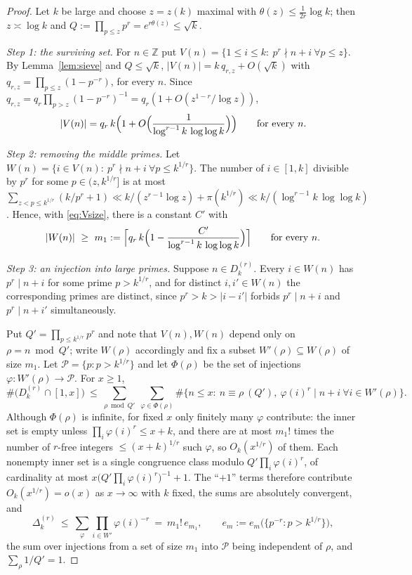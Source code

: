 \documentclass[10pt,a4paper]{amsart}
\numberwithin{equation}{section}
\newcommand{\Z}{\mathbb{Z}}
\begin{document}
\begin{proof}
Let $k$ be large and choose $z=z(k)$ maximal with $\theta(z)\le\frac1{2r}\log k$; then
$z\asymp\log k$ and $Q:=\prod_{p\le z}p^{r}=e^{r\theta(z)}\le\sqrt k$.

\smallskip
\emph{Step 1: the surviving set.}
For $n\in\Z$ put $V(n)=\{1\le i\le k:\ p^{r}\nmid n+i\ \forall p\le z\}$. By
Lemma~\ref{lem:sieve} and $Q\le\sqrt k$,
$|V(n)|=k\,q_{r,z}+O(\sqrt k)$ with $q_{r,z}=\prod_{p\le z}(1-p^{-r})$, for every $n$.
Since $q_{r,z}=q_r\prod_{p>z}(1-p^{-r})^{-1}=q_r(1+O(z^{1-r}/\log z))$,
\begin{equation}\label{eq:Vsize}
  |V(n)|=q_r\,k\Bigl(1+O\Bigl(\frac1{\log^{r-1}k\,\log\log k}\Bigr)\Bigr)
  \qquad\text{for every }n .
\end{equation}

\smallskip
\emph{Step 2: removing the middle primes.}
Let $W(n)=\{i\in V(n):\ p^{r}\nmid n+i\ \forall p\le k^{1/r}\}$. The number of
$i\in[1,k]$ divisible by $p^{r}$ for some $p\in(z,k^{1/r}]$ is at most
$\sum_{z<p\le k^{1/r}}(k/p^{r}+1)\ll k/(z^{r-1}\log z)+\pi(k^{1/r})
\ll k/(\log^{r-1}k\,\log\log k)$. Hence, with \eqref{eq:Vsize}, there is a constant $C'$
with
\begin{equation}\label{eq:m1}
  |W(n)|\ \ge\ m_1:=\Bigl\lceil q_r\,k\Bigl(1-\frac{C'}{\log^{r-1}k\,\log\log k}\Bigr)
  \Bigr\rceil\qquad\text{for every }n .
\end{equation}

\smallskip
\emph{Step 3: an injection into large primes.}
Suppose $n\in D^{(r)}_k$. Every $i\in W(n)$ has $p^{r}\mid n+i$ for some prime
$p>k^{1/r}$, and for distinct $i,i'\in W(n)$ the corresponding primes are distinct, since
$p^{r}>k>|i-i'|$ forbids $p^{r}\mid n+i$ and $p^{r}\mid n+i'$ simultaneously.

Put $Q'=\prod_{p\le k^{1/r}}p^{r}$ and note that $V(n),W(n)$ depend only on
$\rho=n\bmod Q'$; write $W(\rho)$ accordingly and fix a subset $W'(\rho)\subseteq W(\rho)$
of size $m_1$. Let $\mathcal P=\{p:p>k^{1/r}\}$ and let $\Phi(\rho)$ be the set of
injections $\varphi:W'(\rho)\to\mathcal P$. For $x\ge1$,
\[
  \#\bigl(D^{(r)}_k\cap[1,x]\bigr)\ \le\ \sum_{\rho\bmod Q'}\ \sum_{\varphi\in\Phi(\rho)}
  \#\{n\le x:\ n\equiv \rho\ (Q'),\ \varphi(i)^{r}\mid n+i\ \forall i\in W'(\rho)\}.
\]
Although $\Phi(\rho)$ is infinite, for fixed $x$ only finitely many $\varphi$ contribute: the
inner set is empty unless $\prod_i\varphi(i)^{r}\le x+k$, and there are at most $m_1!$ times
the number of $r$-free integers $\le(x+k)^{1/r}$ such $\varphi$, so $O_k(x^{1/r})$ of them.
Each nonempty inner set is a single congruence class modulo
$Q'\prod_i\varphi(i)^{r}$, of cardinality at most
$x\bigl(Q'\prod_i\varphi(i)^{r}\bigr)^{-1}+1$. The ``$+1$'' terms therefore contribute
$O_k(x^{1/r})=o(x)$ as $x\to\infty$ with $k$ fixed, the sums are absolutely convergent, and
\begin{equation}\label{eq:upper-reduction}
  \Delta^{(r)}_k\ \le\ \sum_{\varphi}\prod_{i\in W'}\varphi(i)^{-r}
  \ =\ m_1!\,e_{m_1},\qquad e_m:=e_m\bigl(\{p^{-r}:p>k^{1/r}\}\bigr),
\end{equation}
the sum over injections from a set of size $m_1$ into $\mathcal P$ being independent of
$\rho$, and $\sum_{\rho}1/Q'=1$.


\end{proof}
\end{document}
